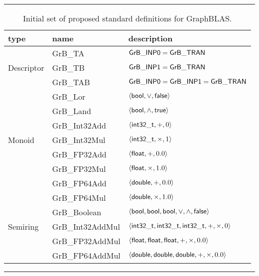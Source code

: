 \begin{table}[htb]
	\hrule
	\caption{Initial set of proposed standard definitions for GraphBLAS.}
	\label{Tab:stddef}
	\begin{center}
	\begin{tabular}{|l|l|l|} \hline
		type		& name				& description \\ \hline
				& {\sf GrB\_TA}			& ${\sf GrB\_INP0} = {\sf GrB\_TRAN}$ \\
		Descriptor	& {\sf GrB\_TB}			& ${\sf GrB\_INP1} = {\sf GrB\_TRAN}$ \\ 
				& {\sf GrB\_TAB}		& ${\sf GrB\_INP0} = {\sf GrB\_INP1} = {\sf GrB\_TRAN}$ \\ \hline
				& {\sf GrB\_Lor}		& $\left\langle {\sf bool}, \vee, {\sf false} \right\rangle$ \\
				& {\sf GrB\_Land}		& $\left\langle {\sf bool}, \wedge, {\sf true} \right\rangle$ \\
				& {\sf GrB\_Int32Add}		& $\left\langle {\sf int32\_t}, +, 0 \right\rangle$ \\
		Monoid		& {\sf GrB\_Int32Mul}		& $\left\langle {\sf int32\_t}, \times, 1 \right\rangle$ \\
				& {\sf GrB\_FP32Add}		& $\left\langle {\sf float}, +, 0.0 \right\rangle$ \\
				& {\sf GrB\_FP32Mul}		& $\left\langle {\sf float}, \times, 1.0 \right\rangle$ \\
				& {\sf GrB\_FP64Add}		& $\left\langle {\sf double}, +, 0.0 \right\rangle$ \\ 
				& {\sf GrB\_FP64Mul}		& $\left\langle {\sf double}, \times, 1.0 \right\rangle$ \\ \hline
				& {\sf GrB\_Boolean}		& $\left\langle {\sf bool}, {\sf bool}, {\sf bool}, \vee, \wedge, {\sf false} \right\rangle$ \\
		Semiring	& {\sf GrB\_Int32AddMul}	& $\left\langle {\sf int32\_t}, {\sf int32\_t}, {\sf int32\_t}, +, \times, 0 \right\rangle$ \\
				& {\sf GrB\_FP32AddMul}		& $\left\langle {\sf float}, {\sf float}, {\sf float}, +, \times, 0.0 \right\rangle$ \\ 
				& {\sf GrB\_FP64AddMul}		& $\left\langle {\sf double}, {\sf double}, {\sf double}, +, \times, 0.0 \right\rangle$ \\ \hline
	\end{tabular}
	\end{center}
	\hrule
\end{table}
